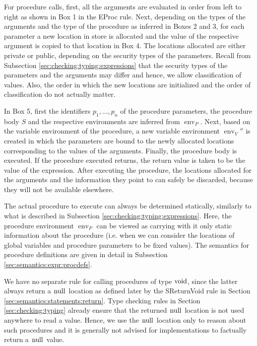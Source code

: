 \documentclass[a4paper, 10pt, draft]{report}
\newcommand{\mycode}[1]{\ensuremath{\mbox{\lstinline{#1}}}}
\begin{document}
For procedure calls, first, all the arguments are evaluated in order from left
to right as shown in Box 1 in the EProc rule. Next, depending on the types of
the arguments and the type of the procedure as inferred in Boxes 2 and 3, for
each parameter a new location in store is allocated and the value of the
respective argument is copied to that location in Box 4. The locations
allocated are either private or public, depending on the security types of the
parameters. Recall from Subsection \ref{sec:checking:typing:expressions} that
the security types of the parameters and the arguments may differ and hence, we
allow classification of values. Also, the order in which the new locations are
initialized and the order of classification do not actually matter.

In Box 5, first the identifiers $p_1, \ldots, p_n$ of the procedure parameters,
the procedure body $S$ and the respective environments are inferred from
$\operatorname{env}_P$. Next, based on the variable environment of the
procedure, a new variable environment $\operatorname{env}_V''$ is created in
which the parameters are bound to the newly allocated locations corresponding
to the values of the arguments. Finally, the procedure body is executed. If the
procedure executed returns, the return value is taken to be the value of the
expression. After executing the procedure, the locations allocated for the
arguments and the information they point to can safely be discarded, because
they will not be available elsewhere.

The actual procedure to execute can always be determined statically, similarly
to what is described in Subsection \ref{sec:checking:typing:expressions}. Here,
the procedure environment $\operatorname{env}_P$ can be viewed as carrying with
it only static information about the procedure (i.e. when we can consider the
locations of global variables and procedure parameters to be fixed values).
The semantics for procedure definitions are given in detail in Subsection
\ref{sec:semantics:expr:procdefs}.

We have no separate rule for calling procedures of type \mycode{void}, since
the latter always return a \mycode{null} location as defined later by the
SReturnVoid rule in Section \ref{sec:semantics:statements:return}. Type
checking rules in Section \ref{sec:checking:typing} already ensure that the
returned \mycode{null} location is not used anywhere to read a value. Hence, we
use the \mycode{null} location only to reason about such procedures and it is
generally not advised for implementations to factually return a \mycode{null}
value.
\end{document}
